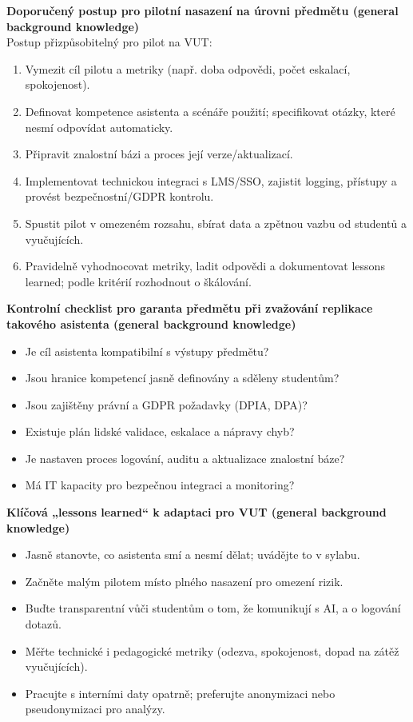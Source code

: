 \bigskip
\textbf{Doporučený postup pro pilotní nasazení na úrovni předmětu (general background knowledge)}\\
Postup přizpůsobitelný pro pilot na VUT:
\begin{enumerate}
  \item Vymezit cíl pilotu a metriky (např. doba odpovědi, počet eskalací, spokojenost).
  \item Definovat kompetence asistenta a scénáře použití; specifikovat otázky, které nesmí odpovídat automaticky.
  \item Připravit znalostní bázi a proces její verze/aktualizací.
  \item Implementovat technickou integraci s LMS/SSO, zajistit logging, přístupy a provést bezpečnostní/GDPR kontrolu.
  \item Spustit pilot v omezeném rozsahu, sbírat data a zpětnou vazbu od studentů a vyučujících.
  \item Pravidelně vyhodnocovat metriky, ladit odpovědi a dokumentovat lessons learned; podle kritérií rozhodnout o škálování.
\end{enumerate}

\bigskip
\textbf{Kontrolní checklist pro garanta předmětu při zvažování replikace takového asistenta (general background knowledge)}\\
\begin{itemize}
  \item Je cíl asistenta kompatibilní s výstupy předmětu?
  \item Jsou hranice kompetencí jasně definovány a sděleny studentům?
  \item Jsou zajištěny právní a GDPR požadavky (DPIA, DPA)?
  \item Existuje plán lidské validace, eskalace a nápravy chyb?
  \item Je nastaven proces logování, auditu a aktualizace znalostní báze?
  \item Má IT kapacity pro bezpečnou integraci a monitoring?
\end{itemize}

\bigskip
\textbf{Klíčová „lessons learned“ k adaptaci pro VUT (general background knowledge)}\\
\begin{itemize}
  \item Jasně stanovte, co asistenta smí a nesmí dělat; uvádějte to v sylabu.
  \item Začněte malým pilotem místo plného nasazení pro omezení rizik.
  \item Buďte transparentní vůči studentům o tom, že komunikují s AI, a o logování dotazů.
  \item Měřte technické i pedagogické metriky (odezva, spokojenost, dopad na zátěž vyučujících).
  \item Pracujte s interními daty opatrně; preferujte anonymizaci nebo pseudonymizaci pro analýzy.
\end{itemize}

